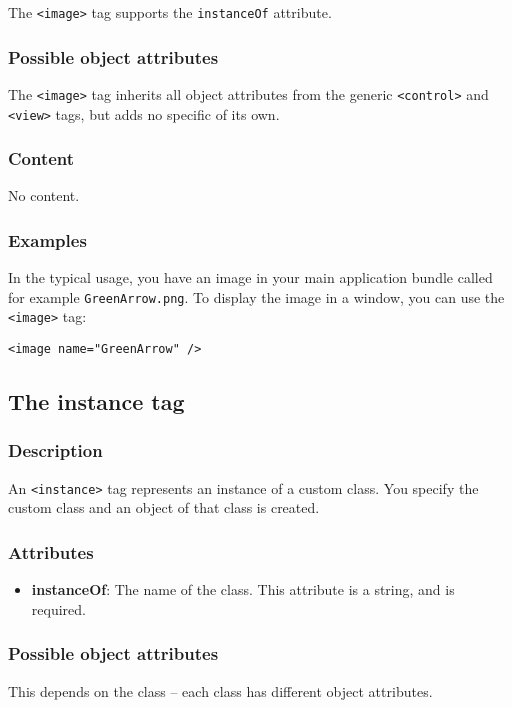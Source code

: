 The \texttt{<image>} tag supports the \texttt{instanceOf} attribute.

\subsubsection{Possible object attributes}
The \texttt{<image>} tag inherits all object attributes from the
generic \texttt{<control>} and \texttt{<view>} tags, but adds no
specific of its own.

\subsubsection{Content}
No content.

\subsubsection{Examples}
In the typical usage, you have an image in your main application
bundle called for example \texttt{GreenArrow.png}.  To display the
image in a window, you can use the \texttt{<image>} tag:
\begin{verbatim}
<image name="GreenArrow" />
\end{verbatim}

\subsection{The instance tag}

\subsubsection{Description}
An \texttt{<instance>} tag represents an instance of a custom class.  You
specify the custom class and an object of that class is created.

\subsubsection{Attributes}
\begin{itemize}
\item {\bf instanceOf}: The name of the class.  This attribute is a
  string, and is required.
\end{itemize}

\subsubsection{Possible object attributes}
This depends on the class -- each class has different object attributes.

